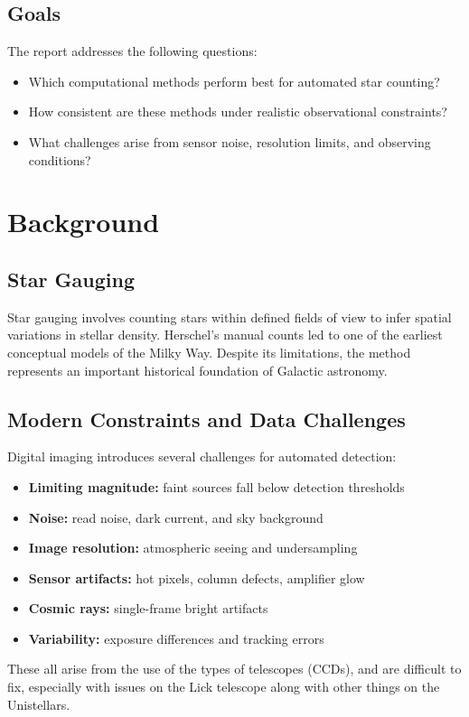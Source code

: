 \documentclass[12pt]{article}
\begin{document}
\subsection{Goals}
The report addresses the following questions:
\begin{itemize}
    \item Which computational methods perform best for automated star counting?
    \item How consistent are these methods under realistic observational constraints?
    \item What challenges arise from sensor noise, resolution limits, and observing conditions?
\end{itemize}

\section{Background}

\subsection{Star Gauging}
Star gauging involves counting stars within defined fields of view to infer spatial variations in stellar density. Herschel's manual counts led to one of the earliest conceptual models of the Milky Way. Despite its limitations, the method represents an important historical foundation of Galactic astronomy.

\subsection{Modern Constraints and Data Challenges}
Digital imaging introduces several challenges for automated detection:
\begin{itemize}
    \item \textbf{Limiting magnitude:} faint sources fall below detection thresholds
    \item \textbf{Noise:} read noise, dark current, and sky background
    \item \textbf{Image resolution:} atmospheric seeing and undersampling
    \item \textbf{Sensor artifacts:} hot pixels, column defects, amplifier glow
    \item \textbf{Cosmic rays:} single-frame bright artifacts
    \item \textbf{Variability:} exposure differences and tracking errors
\end{itemize}
These all arise from the use of the types of telescopes (CCDs), and are difficult to fix, especially with issues on the Lick telescope along with other things on the Unistellars.
\end{document}
